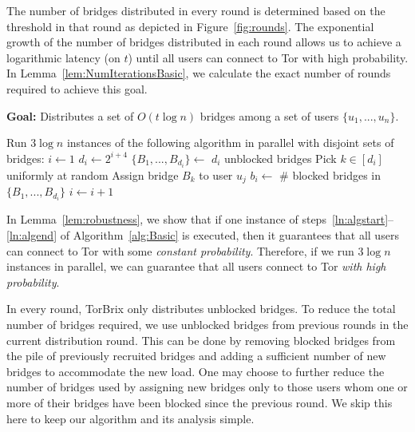 \documentclass[letterpaper,twocolumn,10pt]{article}
\newcommand{\algFont}{\fontsize{10}{13}\selectfont}
\newcommand{\sfsize}{\fontsize{0.73\baselineskip}{0.73\baselineskip}\selectfont}
\newcommand{\sans}[1]{\textsf{\sfsize \mbox{#1}}}
\newcommand{\brix}{\sans{TorBrix}\xspace}
\begin{document}
The number of bridges distributed in every round is determined based on the threshold in that round as depicted in Figure~\ref{fig:rounds}. The exponential growth of the number of bridges distributed in each round allows us to achieve a logarithmic latency (on $t$) until all users can connect to Tor with high probability. In Lemma~\ref{lem:NumIterationsBasic}, we calculate the exact number of rounds required to achieve this goal.
\begin{algorithm}[t]
	\caption{\brix~-- Basic Protocol}
	\label{alg:Basic}
	\vspace{0.4em}
	\textbf{Goal:} Distributes a set of $O(t\log{n})$ bridges among a set of users $\{u_1,...,u_n\}$.
	
	\algFont \vspace{2pt}
	\begin{algorithmic}[1]
		\Statex \hspace{-\algorithmicindent} Run $3\log{n}$ instances of the following algorithm in parallel with disjoint sets of bridges:
		\State ${i \gets 1}$  \label{ln:algstart}
		\While{\True}
			\State $d_i \gets 2^{i+4}$	\label{ln:forparallel} \label{ln:ifreasonable}
				\State $\{B_1,...,B_{d_i}\} \gets$ $d_i$ unblocked bridges \label{ln:RecruitBridges}						
					
					\State Pick $k \in [d_i]$ uniformly at random 
					\State Assign bridge $B_{k}$ to user $u_j$				
				\EndFor			\label{ln:IterationEnd}
			 \label{ln:ConditionSimple} %
				\State $b_i \gets$ \# blocked bridges in $\{B_1, ..., B_{d_i}\}$
			\EndWhile
			\State $i \gets i+1$ \label{ln:IncrementSimple}
		\EndWhile	\label{ln:algend}
	\end{algorithmic}	
\end{algorithm}
In Lemma~\ref{lem:robustness}, we show that if one instance of steps~\ref{ln:algstart}--\ref{ln:algend} of Algorithm~\ref{alg:Basic} is executed, then it guarantees that all users can connect to Tor with some \emph{constant probability}. Therefore, if we run $3\log{n}$ instances in parallel, we can guarantee that all users connect to Tor \emph{with high probability}.

In every round, \brix only distributes unblocked bridges. To reduce the total number of bridges required, we use unblocked bridges from previous rounds in the current distribution round. This can be done by removing blocked bridges from the pile of previously recruited bridges and adding a sufficient number of new bridges to accommodate the new load. One may choose to further reduce the number of bridges used by assigning new bridges only to those users whom one or more of their bridges have been blocked since the previous round. We skip this here to keep our algorithm and its analysis simple.
\end{document}
